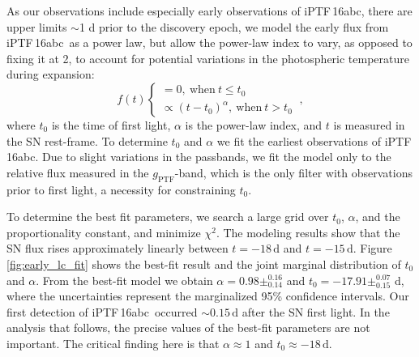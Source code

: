 \documentclass[twocolumn]{aastex61}
\newcommand{\abc}{iPTF\,16abc}
\begin{document}
As our observations include especially early observations of \abc, there are upper limits $\sim$1 d prior to the discovery epoch, we model the early flux from \abc\ as a power law, but allow the power-law index to vary, as opposed to fixing it at 2, to account for potential variations in the photospheric temperature during expansion:
\begin{equation}
  \label{eq:broken_power_law}
  f(t) \left\{
    \begin{array}{ll}
      = 0,\ \textrm{when}\ t \le t_0 \\
      \propto (t-t_0)^{\alpha},\ \textrm{when}\ t>t_0
    \end{array}
  \right.\ ,
\end{equation}
where $t_0$ is the time of first light, $\alpha$ is the power-law index, and $t$ is measured in the SN rest-frame. To determine $t_0$ and $\alpha$ we fit the earliest observations of \abc. Due to slight variations in the passbands, we fit the model only to the relative flux measured in the $g_\mathrm{PTF}$-band, which is the only filter with observations prior to first light, a necessity for constraining $t_0$.

To determine the best fit parameters, we search a large grid over $t_0$, $\alpha$,
and the proportionality constant, and minimize $\chi^2$. 
The modeling results show that the SN flux rises approximately
linearly between
$t=-18\,\textrm{d}$ and $t=-15\,\textrm{d}$. Figure \ref{fig:early_lc_fit} shows the best-fit result and
the joint marginal distribution of $t_0$ and $\alpha$. From the
best-fit model we obtain $\alpha=0.98 \pm ^{0.16}_{0.14}$ and $t_0=-17.91 \pm ^{0.07}_{0.15}$ d, where the uncertainties represent the marginalized 95\% confidence intervals. Our first
detection of \abc\ occurred $\sim$${0.15}\,\textrm{d}$ after 
the SN first light. 
In the analysis that follows, the precise values of the best-fit parameters are not important. The critical finding here is that $\alpha \approx 1$ and $t_0 \approx -18 \, \mathrm{d}$. 
\end{document}

